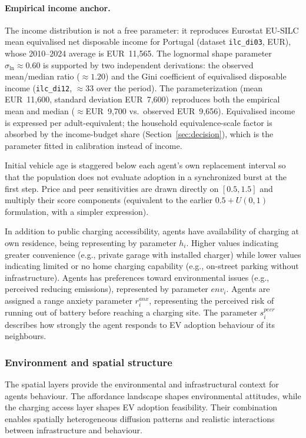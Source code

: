 \documentclass[11pt]{article}
\begin{document}
\paragraph{Empirical income anchor.} The income distribution is not a free
parameter: it reproduces Eurostat EU-SILC mean equivalised net disposable
income for Portugal (dataset \texttt{ilc\_di03}, EUR), whose 2010--2024
average is EUR~11{,}565. The lognormal shape parameter
$\sigma_{\ln}\approx 0.60$ is supported by two independent derivations: the
observed mean/median ratio ($\approx 1.20$) and the Gini coefficient of
equivalised disposable income (\texttt{ilc\_di12}, $\approx 33$ over the
period). The parameterization (mean EUR~11{,}600, standard deviation
EUR~7{,}600) reproduces both the empirical mean and median
($\approx$EUR~9{,}700 vs.\ observed EUR~9{,}656). Equivalised income
is expressed per adult-equivalent; the household equivalence-scale factor is
absorbed by the income-budget share (Section~\ref{sec:decision}), which is
the parameter fitted in calibration instead of income.

Initial vehicle age is staggered below each agent's own replacement interval
so that the population does not evaluate adoption in a synchronized burst at
the first step. Price and peer sensitivities are drawn directly on
$[0.5, 1.5]$ and multiply their score components (equivalent to the earlier
$0.5+U(0,1)$ formulation, with a simpler expression).

In addition to public charging accessibility, agents have availability of
charging at own residence, being representing by parameter $h_i$. Higher
values indicating greater convenience (e.g., private garage with installed
charger) while lower values indicating limited or no home charging
capability (e.g., on-street parking without infrastructure). Agents has
preferences toward environmental issues (e.g., perceived reducing
emissions), represented by parameter $env_i$. Agents are assigned a range
anxiety parameter $r^{anx}_i$, representing the perceived risk of running
out of battery before reaching a charging site. The parameter $s^{peer}_i$
describes how strongly the agent responds to EV adoption behaviour of its
neighbours.

\subsubsection{Environment and spatial structure}

The spatial layers provide the environmental and infrastructural context for
agents behaviour. The affordance landscape shapes environmental attitudes,
while the charging access layer shapes EV adoption feasibility. Their
combination enables spatially heterogeneous diffusion patterns and realistic
interactions between infrastructure and behaviour.
\end{document}
